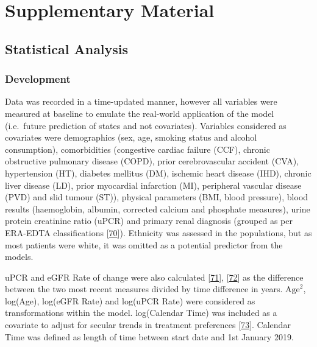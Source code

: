 \documentclass[
]{article}
\begin{document}
\hypertarget{appendix-appendices}{%
\appendix}


\hypertarget{chapdevpapersupp}{%
\section{Supplementary Material}\label{chapdevpapersupp}}

\hypertarget{statistical-analysis}{%
\subsection{Statistical Analysis}\label{statistical-analysis}}

\hypertarget{development}{%
\subsubsection{Development}\label{development}}

Data was recorded in a time-updated manner, however all variables were measured at baseline to emulate the real-world application of the model (i.e.~future prediction of states and not covariates). Variables considered as covariates were demographics (sex, age, smoking status and alcohol consumption), comorbidities (congestive cardiac failure (CCF), chronic obstructive pulmonary disease (COPD), prior cerebrovascular accident (CVA), hypertension (HT), diabetes mellitus (DM), ischemic heart disease (IHD), chronic liver disease (LD), prior myocardial infarction (MI), peripheral vascular disease (PVD) and slid tumour (ST)), physical parameters (BMI, blood pressure), blood results (haemoglobin, albumin, corrected calcium and phosphate measures), urine protein creatinine ratio (uPCR) and primary renal diagnosis (grouped as per ERA-EDTA classifications {[}\protect\hyperlink{ref-venkat-raman_new_2012}{70}{]}). Ethnicity was assessed in the populations, but as most patients were white, it was omitted as a potential predictor from the models.

uPCR and eGFR Rate of change were also calculated {[}\protect\hyperlink{ref-kovesdy_past_2016}{71}{]}, {[}\protect\hyperlink{ref-naimark_past_2016}{72}{]} as the difference between the two most recent measures divided by time difference in years. \(\textrm{Age}^2\), log(Age), log(eGFR Rate) and log(uPCR Rate) were considered as transformations within the model. log(Calendar Time) was included as a covariate to adjust for secular trends in treatment preferences {[}\protect\hyperlink{ref-bhatnagar_epidemiology_2015}{73}{]}. Calendar Time was defined as length of time between start date and 1st January 2019.
\end{document}
